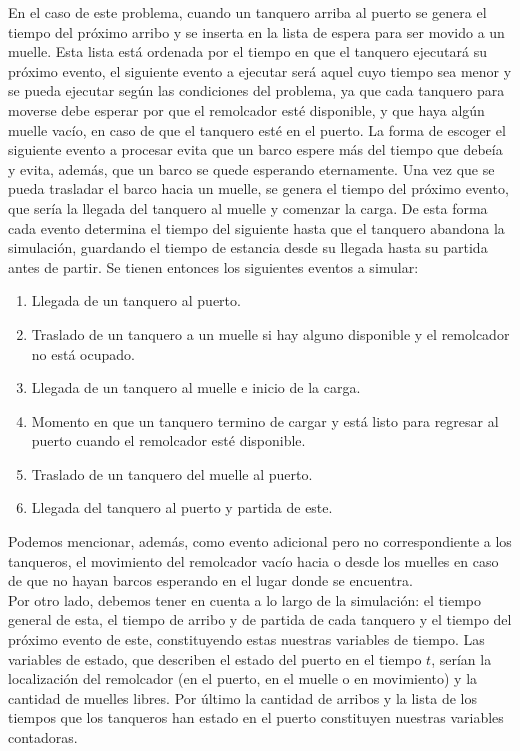 \documentclass[twoside]{article}
\begin{document}
En el caso de este problema, cuando un tanquero arriba al puerto se genera el tiempo del pr\'oximo arribo y se inserta en la lista de espera para ser movido a un muelle. Esta lista est\'a ordenada por el tiempo en que el tanquero ejecutar\'a su pr\'oximo evento, el siguiente evento a ejecutar ser\'a aquel cuyo tiempo sea menor y se pueda ejecutar seg\'un las condiciones del problema, ya que cada tanquero para moverse debe esperar por que el remolcador est\'e disponible, y que haya alg\'un muelle vac\'io, en caso de que el tanquero est\'e en el puerto. La forma de escoger el siguiente evento a procesar evita que un barco espere m\'as del tiempo que debe\'ia y evita, adem\'as, que un barco se quede esperando eternamente. Una vez que se pueda trasladar el barco hacia un muelle, se genera el tiempo del pr\'oximo evento, que ser\'ia la llegada del tanquero al muelle y comenzar la carga. De esta forma cada evento determina el tiempo del siguiente hasta que el tanquero abandona la simulaci\'on, guardando el tiempo de estancia desde su llegada hasta su partida antes de partir. Se tienen entonces los siguientes eventos a simular:
\begin{enumerate}
\item Llegada de un tanquero al puerto.
\item Traslado de un tanquero a un muelle si hay alguno disponible y el remolcador no est\'a ocupado.
\item Llegada de un tanquero al muelle e inicio de la carga.
\item Momento en que un tanquero termino de cargar y est\'a listo para regresar al puerto cuando el remolcador est\'e disponible.
\item Traslado de un tanquero del muelle al puerto.
\item Llegada del tanquero al puerto y partida de este.
\end{enumerate}

Podemos mencionar, adem\'as, como evento adicional pero no correspondiente a los tanqueros, el movimiento del remolcador vac\'io hacia o desde los muelles en caso de que no hayan barcos esperando en el lugar donde se encuentra.\\

Por otro lado, debemos tener en cuenta a lo largo de la simulaci\'on: el tiempo general de esta, el tiempo de arribo y de partida de cada tanquero y el tiempo del pr\'oximo evento de este, constituyendo estas nuestras variables de tiempo. Las variables de estado, que describen el estado del puerto en el tiempo $t$, ser\'ian la localizaci\'on del remolcador (en el puerto, en el muelle o en movimiento) y la cantidad de muelles libres. Por \'ultimo la cantidad de arribos y la lista de los tiempos que los tanqueros han estado en el puerto constituyen nuestras variables contadoras.
\end{document}
